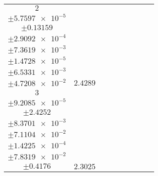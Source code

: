 \documentclass[8pt]{article}
\begin{document}
\begin{longtable}[l]{c c c c c c c c c}
$\num{2}$ & \begin{tabular}[c]{@{}c@{}}$\num{3.1849e-2}$ \\ $\pm\num{5.7597e-5}$\end{tabular} & \begin{tabular}[c]{@{}c@{}}$\num{-0.15917}$ \\ $\pm\num{0.13159}$\end{tabular} & \begin{tabular}[c]{@{}c@{}}$\num{-7.4861}$ \\ $\pm\num{2.9092e-4}$\end{tabular} & \begin{tabular}[c]{@{}c@{}}$\num{1.8501e+3}$ \\ $\pm\num{7.3619e-3}$\end{tabular} & \begin{tabular}[c]{@{}c@{}}$\num{3.7012}$ \\ $\pm\num{1.4728e-5}$\end{tabular} & \begin{tabular}[c]{@{}c@{}}$\num{1.1857}$ \\ $\pm\num{6.5331e-3}$\end{tabular} & \begin{tabular}[c]{@{}c@{}}$\num{4.0122}$ \\ $\pm\num{4.7208e-2}$\end{tabular} & $\num{2.4289}$\\
$\num{3}$ & \begin{tabular}[c]{@{}c@{}}$\num{2.8921e-2}$ \\ $\pm\num{9.2085e-5}$\end{tabular} & \begin{tabular}[c]{@{}c@{}}$\num{-0.14127}$ \\ $\pm\num{2.4252}$\end{tabular} & \begin{tabular}[c]{@{}c@{}}$\num{-7.3084}$ \\ $\pm\num{8.3701e-3}$\end{tabular} & \begin{tabular}[c]{@{}c@{}}$\num{1.8503e+3}$ \\ $\pm\num{7.1104e-2}$\end{tabular} & \begin{tabular}[c]{@{}c@{}}$\num{3.7017}$ \\ $\pm\num{1.4225e-4}$\end{tabular} & \begin{tabular}[c]{@{}c@{}}$\num{1.1467}$ \\ $\pm\num{7.8319e-2}$\end{tabular} & \begin{tabular}[c]{@{}c@{}}$\num{4.0616}$ \\ $\pm\num{0.4176}$\end{tabular} & $\num{2.3025}$\\

\end{longtable}
\end{document}
